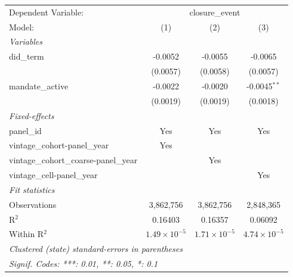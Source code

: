 
\begingroup
\centering
\begin{tabular}{lccc}
   \tabularnewline \midrule \midrule
   Dependent Variable: & \multicolumn{3}{c}{closure\_event}\\
   Model:                                 & (1)                   & (2)                   & (3)\\  
   \midrule
   \emph{Variables}\\
   did\_term                              & -0.0052               & -0.0055               & -0.0065\\   
                                          & (0.0057)              & (0.0058)              & (0.0057)\\   
   mandate\_active                        & -0.0022               & -0.0020               & -0.0045$^{**}$\\   
                                          & (0.0019)              & (0.0019)              & (0.0018)\\   
   \midrule
   \emph{Fixed-effects}\\
   panel\_id                              & Yes                   & Yes                   & Yes\\  
   vintage\_cohort-panel\_year            & Yes                   &                       & \\  
   vintage\_cohort\_coarse-panel\_year    &                       & Yes                   & \\  
   vintage\_cell-panel\_year              &                       &                       & Yes\\  
   \midrule
   \emph{Fit statistics}\\
   Observations                           & 3,862,756             & 3,862,756             & 2,848,365\\  
   R$^2$                                  & 0.16403               & 0.16357               & 0.06092\\  
   Within R$^2$                           & $1.49\times 10^{-5}$  & $1.71\times 10^{-5}$  & $4.74\times 10^{-5}$\\   
   \midrule \midrule
   \multicolumn{4}{l}{\emph{Clustered (state) standard-errors in parentheses}}\\
   \multicolumn{4}{l}{\emph{Signif. Codes: ***: 0.01, **: 0.05, *: 0.1}}\\
\end{tabular}
\par\endgroup


